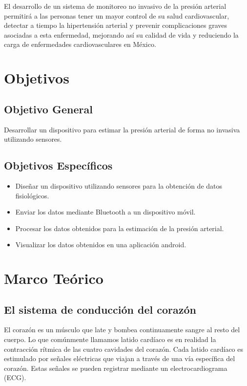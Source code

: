 El desarrollo de un sistema de monitoreo no invasivo de la presión arterial permitirá a las personas tener un mayor control de su salud cardiovascular, detectar a tiempo la hipertensión arterial y prevenir complicaciones graves asociadas a esta enfermedad, mejorando así su calidad de vida y reduciendo la carga de enfermedades cardiovasculares en México.


\newpage
\section{Objetivos}
    \subsection{Objetivo General}
    Desarrollar un dispositivo para estimar la presión arterial de forma no invasiva utilizando sensores.
    \subsection{Objetivos Específicos}
    \begin{itemize}
        \item Diseñar un dispositivo utilizando sensores para la obtención de datos fisiológicos.
        \item Enviar los datos mediante Bluetooth a un dispositivo móvil.
        \item Procesar los datos obtenidos para la estimación de la presión arterial.
        \item Visualizar los datos obtenidos en una aplicación android.
    \end{itemize}

\newpage
\section{Marco Teórico}

    \subsection{El sistema de conducción del corazón}

    El corazón es un músculo que late y bombea continuamente sangre al resto del cuerpo. Lo que comúnmente llamamos latido cardíaco es en realidad la contracción rítmica de las cuatro cavidades del corazón. Cada latido cardíaco es estimulado por señales eléctricas que viajan a través de una vía específica del corazón. Estas señales se pueden registrar mediante un electrocardiograma (ECG).

